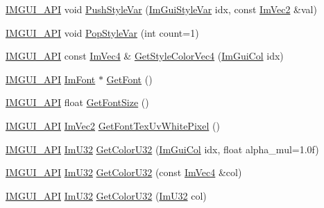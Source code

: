 \begin{DoxyCompactItemize}
\item 
\mbox{\hyperlink{imgui_8h_a43829975e84e45d1149597467a14bbf5}{I\+M\+G\+U\+I\+\_\+\+A\+PI}} void \mbox{\hyperlink{namespace_im_gui_ae404b6978e9aedec5c16627d8c45f923}{Push\+Style\+Var}} (\mbox{\hyperlink{imgui_8h_ac919acabce24faae590e295b424874ca}{Im\+Gui\+Style\+Var}} idx, const \mbox{\hyperlink{struct_im_vec2}{Im\+Vec2}} \&val)
\item 
\mbox{\hyperlink{imgui_8h_a43829975e84e45d1149597467a14bbf5}{I\+M\+G\+U\+I\+\_\+\+A\+PI}} void \mbox{\hyperlink{namespace_im_gui_a14116e57d81e326adef2a702e65781d4}{Pop\+Style\+Var}} (int count=1)
\item 
\mbox{\hyperlink{imgui_8h_a43829975e84e45d1149597467a14bbf5}{I\+M\+G\+U\+I\+\_\+\+A\+PI}} const \mbox{\hyperlink{struct_im_vec4}{Im\+Vec4}} \& \mbox{\hyperlink{namespace_im_gui_ad838e580972e2c4b3da2b0f60754b662}{Get\+Style\+Color\+Vec4}} (\mbox{\hyperlink{imgui_8h_a1b0467ec582e731ae6292fef726fb5fe}{Im\+Gui\+Col}} idx)
\item 
\mbox{\hyperlink{imgui_8h_a43829975e84e45d1149597467a14bbf5}{I\+M\+G\+U\+I\+\_\+\+A\+PI}} \mbox{\hyperlink{struct_im_font}{Im\+Font}} $\ast$ \mbox{\hyperlink{namespace_im_gui_a43cf349576e20fac4a1300269320ad8f}{Get\+Font}} ()
\item 
\mbox{\hyperlink{imgui_8h_a43829975e84e45d1149597467a14bbf5}{I\+M\+G\+U\+I\+\_\+\+A\+PI}} float \mbox{\hyperlink{namespace_im_gui_ac592ae8e0aa4a1a06502ec7872bc8da8}{Get\+Font\+Size}} ()
\item 
\mbox{\hyperlink{imgui_8h_a43829975e84e45d1149597467a14bbf5}{I\+M\+G\+U\+I\+\_\+\+A\+PI}} \mbox{\hyperlink{struct_im_vec2}{Im\+Vec2}} \mbox{\hyperlink{namespace_im_gui_a3092da6abc1d04f3287c084435dc6026}{Get\+Font\+Tex\+Uv\+White\+Pixel}} ()
\item 
\mbox{\hyperlink{imgui_8h_a43829975e84e45d1149597467a14bbf5}{I\+M\+G\+U\+I\+\_\+\+A\+PI}} \mbox{\hyperlink{imgui_8h_a118cff4eeb8d00e7d07ce3d6460eed36}{Im\+U32}} \mbox{\hyperlink{namespace_im_gui_a0de2d9bd347d9866511eb8d014e62556}{Get\+Color\+U32}} (\mbox{\hyperlink{imgui_8h_a1b0467ec582e731ae6292fef726fb5fe}{Im\+Gui\+Col}} idx, float alpha\+\_\+mul=1.\+0f)
\item 
\mbox{\hyperlink{imgui_8h_a43829975e84e45d1149597467a14bbf5}{I\+M\+G\+U\+I\+\_\+\+A\+PI}} \mbox{\hyperlink{imgui_8h_a118cff4eeb8d00e7d07ce3d6460eed36}{Im\+U32}} \mbox{\hyperlink{namespace_im_gui_ac701752365ddd58cecc1956fc62921a8}{Get\+Color\+U32}} (const \mbox{\hyperlink{struct_im_vec4}{Im\+Vec4}} \&col)
\item 
\mbox{\hyperlink{imgui_8h_a43829975e84e45d1149597467a14bbf5}{I\+M\+G\+U\+I\+\_\+\+A\+PI}} \mbox{\hyperlink{imgui_8h_a118cff4eeb8d00e7d07ce3d6460eed36}{Im\+U32}} \mbox{\hyperlink{namespace_im_gui_a834649713437e8fdfa0e5a4fb780d35b}{Get\+Color\+U32}} (\mbox{\hyperlink{imgui_8h_a118cff4eeb8d00e7d07ce3d6460eed36}{Im\+U32}} col)

\end{DoxyCompactItemize}
